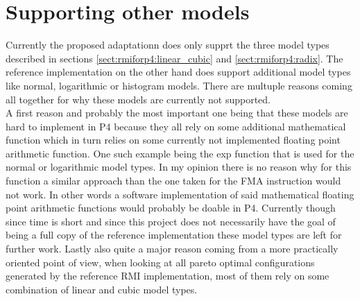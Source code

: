 \section{Supporting other models}
Currently the proposed adaptationn does only supprt the three model types described in sections \ref{sect:rmiforp4:linear_cubic} and \ref{sect:rmiforp4:radix}. The reference implementation on the other hand does support additional model types like normal, logarithmic or histogram models. There are multuple reasons coming all together for why these models are currently not supported.\\

A first reason and probably the most important one being that these models are hard to implement in P4 because they all rely on some additional mathematical function which in turn relies on some currently not implemented floating point arithmetic function. One such example being the exp function that is used for the normal or logarithmic model types. In my opinion there is no reason why for this function a similar approach than the one taken for the FMA instruction would not work. In other words a software implementation of said mathematical floating point arithmetic functions would probably be doable in P4. Currently though since time is short and since this project does not necessarily have the goal of being a full copy of the reference implementation these model types are left for further work. Lastly also quite a major reason coming from a more practically oriented point of view, when looking at all pareto optimal configurations generated by the reference RMI implementation, most of them rely on some combination of linear and cubic model types.
